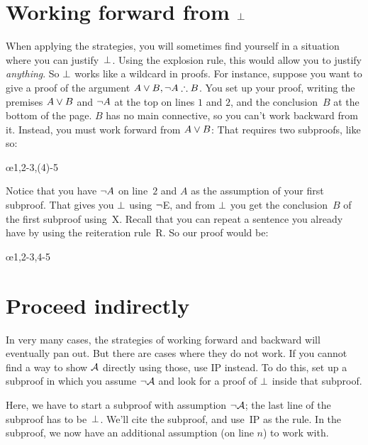 \section{Working forward from $\bot$}\label{sec:backred}

When applying the strategies, you will sometimes find yourself in a situation where you can justify~$\bot$. Using the explosion rule, this would allow you to justify \emph{anything}. So $\bot$ works like a wildcard in proofs. For instance, suppose you want to give a proof of the argument $A \eor B, \enot A \therefore B$. You set up your proof, writing the premises $A \vee B$ and $\neg A$ at the top on lines $1$ and $2$, and the conclusion~$B$ at the bottom of the page. $B$ has no main connective, so you can't work backward from it. Instead, you must work forward from $A \vee B$: That requires two subproofs, like so:
\begin{fitchproof}
	\PR
	\PR
	\open
	 \AS
	\ellipsesline 
	\close 
	\open
	\AS
	\ellipsesline
	\close
	\oe{1,2-3,(4)-5} 
\end{fitchproof} 
Notice that you have $\neg A$ on line~$2$ and $A$ as the assumption of your first subproof. That gives you $\bot$ using $\neg$E, and from $\bot$ you get the conclusion~$B$ of the first subproof using~X. Recall that you can repeat a sentence you already have by using the reiteration rule~R. So our proof would be:
\begin{fitchproof}
	\PR
	\PR
	\open
	 \AS
	\close 
	\open
	\AS
	\close
	\oe{1,2-3,4-5} 
\end{fitchproof} 

\section{Proceed indirectly}

In very many cases, the strategies of working forward and backward will eventually pan out. But there are cases where they do not work.  If you cannot find a way to show $\mathcal{A}$ directly using those, use IP instead. To do this, set up a subproof in which you assume $\neg\mathcal{A}$ and look for a proof of $\bot$ inside that subproof.

\begin{fitchproof}
\open
{}\AS
\ellipsesline 
{}
\close
{}
\end{fitchproof}
Here, we have to start a subproof with assumption $\neg \mathcal{A}$;
the last line of the subproof has to be~$\bot$. We'll cite the subproof, and use~IP as the rule.  In the subproof, we now have an additional assumption (on line $n$) to work with.

